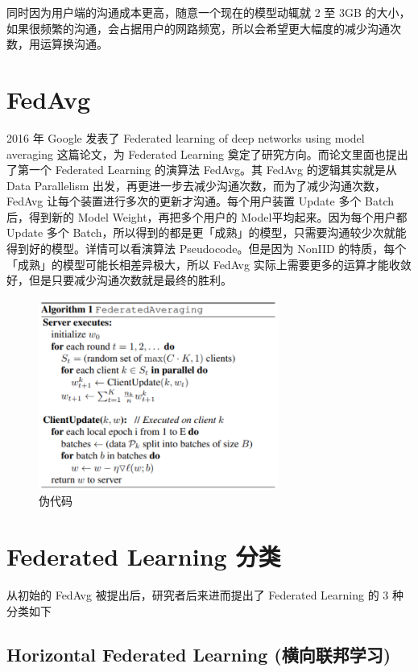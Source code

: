 同时因为用户端的沟通成本更高，随意一个现在的模型动辄就 2 至 3GB 的大小，如果很频繁的沟通，会占据用户的网路频宽，所以会希望更大幅度的减少沟通次数，用运算换沟通。

\section{FedAvg}

2016 年 Google 发表了 Federated learning of deep networks using model averaging 这篇论文，为 Federated Learning 奠定了研究方向。而论文里面也提出了第一个 Federated Learning 的演算法 FedAvg。其 FedAvg 的逻辑其实就是从 Data Parallelism 出发，再更进一步去减少沟通次数，而为了减少沟通次数，FedAvg 让每个装置进行多次的更新才沟通。每个用户装置 Update 多个 Batch后，得到新的 Model Weight，再把多个用户的 Model平均起来。因为每个用户都 Update 多个 Batch，所以得到的都是更「成熟」的模型，只需要沟通较少次就能得到好的模型。详情可以看演算法 Pseudocode。但是因为 NonIID 的特质，每个「成熟」的模型可能长相差异极大，所以 FedAvg 实际上需要更多的运算才能收敛好，但是只要减少沟通次数就是最终的胜利。

\begin{figure}[htb]
\centering 
\includegraphics[width=0.70\textwidth]{img/newch2m2.png} 
\caption{伪代码}
\label{Test}
\end{figure}

\section{Federated Learning 分类}

从初始的 FedAvg 被提出后，研究者后来进而提出了 Federated Learning 的 3 种分类如下

\subsection{Horizontal Federated Learning (横向联邦学习)}

